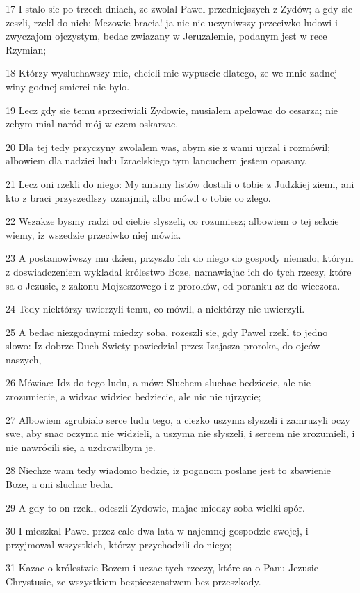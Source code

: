 \par 17 I stalo sie po trzech dniach, ze zwolal Pawel przedniejszych z Zydów; a gdy sie zeszli, rzekl do nich: Mezowie bracia! ja nic nie uczyniwszy przeciwko ludowi i zwyczajom ojczystym, bedac zwiazany w Jeruzalemie, podanym jest w rece Rzymian;
\par 18 Którzy wysluchawszy mie, chcieli mie wypuscic dlatego, ze we mnie zadnej winy godnej smierci nie bylo.
\par 19 Lecz gdy sie temu sprzeciwiali Zydowie, musialem apelowac do cesarza; nie zebym mial naród mój w czem oskarzac.
\par 20 Dla tej tedy przyczyny zwolalem was, abym sie z wami ujrzal i rozmówil; albowiem dla nadziei ludu Izraelskiego tym lancuchem jestem opasany.
\par 21 Lecz oni rzekli do niego: My anismy listów dostali o tobie z Judzkiej ziemi, ani kto z braci przyszedlszy oznajmil, albo mówil o tobie co zlego.
\par 22 Wszakze bysmy radzi od ciebie slyszeli, co rozumiesz; albowiem o tej sekcie wiemy, iz wszedzie przeciwko niej mówia.
\par 23 A postanowiwszy mu dzien, przyszlo ich do niego do gospody niemalo, którym z doswiadczeniem wykladal królestwo Boze, namawiajac ich do tych rzeczy, które sa o Jezusie, z zakonu Mojzeszowego i z proroków, od poranku az do wieczora.
\par 24 Tedy niektórzy uwierzyli temu, co mówil, a niektórzy nie uwierzyli.
\par 25 A bedac niezgodnymi miedzy soba, rozeszli sie, gdy Pawel rzekl to jedno slowo: Iz dobrze Duch Swiety powiedzial przez Izajasza proroka, do ojców naszych,
\par 26 Mówiac: Idz do tego ludu, a mów: Sluchem sluchac bedziecie, ale nie zrozumiecie, a widzac widziec bedziecie, ale nic nie ujrzycie;
\par 27 Albowiem zgrubialo serce ludu tego, a ciezko uszyma slyszeli i zamruzyli oczy swe, aby snac oczyma nie widzieli, a uszyma nie slyszeli, i sercem nie zrozumieli, i nie nawrócili sie, a uzdrowilbym je.
\par 28 Niechze wam tedy wiadomo bedzie, iz poganom poslane jest to zbawienie Boze, a oni sluchac beda.
\par 29 A gdy to on rzekl, odeszli Zydowie, majac miedzy soba wielki spór.
\par 30 I mieszkal Pawel przez cale dwa lata w najemnej gospodzie swojej, i przyjmowal wszystkich, którzy przychodzili do niego;
\par 31 Kazac o królestwie Bozem i uczac tych rzeczy, które sa o Panu Jezusie Chrystusie, ze wszystkiem bezpieczenstwem bez przeszkody.


